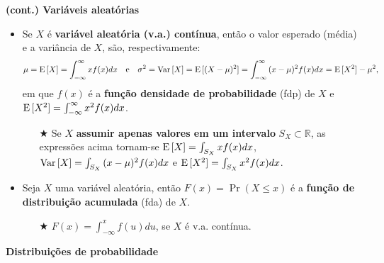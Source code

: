 \documentclass[10pt]{article}%
\def\Var{{\rm Var}\,}
\def\E{{\rm E}\,}
\begin{document}
\textbf{(cont.) Variáveis aleatórias}

 \begin{itemize}%
\item Se $X$ é {\bf variável aleatória (v.a.) contínua}, então o valor esperado (média) e a variância de $X$, são, respectivamente:
$$
\mu = \E[X] = \int_{-\infty}^{\infty}{xf(x)dx}\quad\mbox{e}\quad \sigma^2 = \Var[X] = \E[(X - \mu)^2] = \int_{-\infty}^{\infty}{(x - \mu)^2 f(x)dx} = \E[X^2] - \mu^2,
$$
em que $f(x)$ é a {\bf função densidade de probabilidade} (fdp) de $X$ e $\E[X^2] = \int_{-\infty}^{\infty}{x^2f(x)dx}$.
\begin{itemize}
\item[$\bigstar$] Se $X$ {\bf assumir apenas valores em um intervalo} $S_X \subset \mathbb{R}$, as expressões acima tornam-se $\E[X] = \int_{S_X}{xf(x)dx}$, $\Var[X] = \int_{S_X}{(x - \mu)^2f(x)dx}$ e $\E[X^2] = \int_{S_X}{x^2f(x)dx}$.
\end{itemize}
\item Seja $X$ uma variável aleatória, então $F(x) = \Pr(X\leq x)$ é a {\bf função de distribuição acumulada} (fda) de $X$.
\begin{itemize}
\item[$\bigstar$] $\displaystyle{F(x) = \int_{-\infty}^x{f(u)du}}$, se $X$ é v.a. contínua.
\end{itemize}
\end{itemize}


\textbf{Distribuições de probabilidade}
\end{document}
